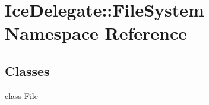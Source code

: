 \hypertarget{namespace_ice_delegate_1_1_file_system}{}\section{Ice\+Delegate\+:\+:File\+System Namespace Reference}
\label{namespace_ice_delegate_1_1_file_system}
\subsection*{Classes}
\begin{DoxyCompactItemize}
\item 
class \hyperlink{class_ice_delegate_1_1_file_system_1_1_file}{File}
\end{DoxyCompactItemize}
